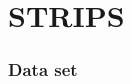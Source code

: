 \documentclass{beamer}
\begin{document}

\section{STRIPS}

\begin{frame}
  \frametitle{Data set}

  \begin{center}
  \end{center}

  
\end{frame}
\end{document}
